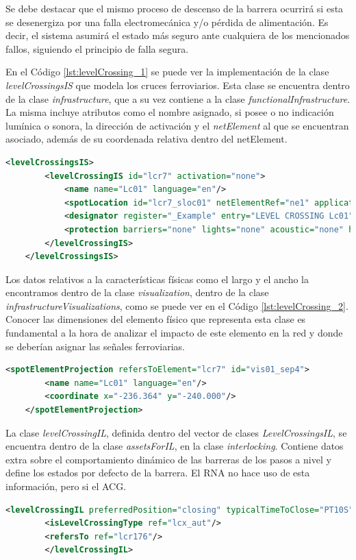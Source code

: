     Se debe destacar que el mismo proceso de descenso de la barrera ocurrirá si esta se desenergiza por una falla electromecánica y/o pérdida de alimentación. Es decir, el sistema asumirá el estado más seguro ante cualquiera de los mencionados fallos, siguiendo el principio de falla segura.

    En el Código \ref{lst:levelCrossing_1} se puede ver la implementación de la clase \textit{levelCrossingsIS} que modela los cruces ferroviarios. Esta clase se encuentra dentro de la clase \textit{infrastructure}, que a su vez contiene a la clase \textit{functionalInfrastructure}. La misma incluye atributos como el nombre asignado, si posee o no indicación lumínica o sonora, la dirección de activación y el \textit{netElement} al que se encuentran asociado, además de su coordenada relativa dentro del netElement.

    \begin{lstlisting}[language = XML, caption = Clase \textit{LevelCrossingsIS} , label = {lst:levelCrossing_1}]
    <levelCrossingsIS>
        <levelCrossingIS id="lcr7" activation="none">
            <name name="Lc01" language="en"/>
            <spotLocation id="lcr7_sloc01" netElementRef="ne1" applicationDirection="both" intrinsicCoord="0.3145"/>
            <designator register="_Example" entry="LEVEL CROSSING Lc01"/>
            <protection barriers="none" lights="none" acoustic="none" hasActiveProtection="true"/>
        </levelCrossingIS>
    </levelCrossingsIS>
    \end{lstlisting}

	Los datos relativos a la características físicas como el largo y el ancho la encontramos dentro de la clase \textit{visualization}, dentro de la clase \textit{infrastructureVisualizations}, como se puede ver en el Código \ref{lst:levelCrossing_2}.  Conocer las dimensiones del elemento físico que representa esta clase es fundamental a la hora de analizar el impacto de este elemento en la red y donde se deberían asignar las señales ferroviarias.
	
    \begin{lstlisting}[language = XML, caption = Clase \textit{Visualization} , label = {lst:levelCrossing_2}]
    <spotElementProjection refersToElement="lcr7" id="vis01_sep4">
        <name name="Lc01" language="en"/>
        <coordinate x="-236.364" y="-240.000"/>
    </spotElementProjection>
    \end{lstlisting}

    La clase \textit{levelCrossingIL}, definida dentro del vector de clases \textit{LevelCrossingsIL}, se encuentra dentro de la clase \textit{assetsForIL}, en la clase \textit{interlocking}. Contiene datos extra sobre el comportamiento dinámico de las barreras de los pasos a nivel y define los estados por defecto de la barrera. El RNA no hace uso de esta información, pero si el ACG.
    
    \begin{lstlisting}[language = XML, caption = Clase \textit{LevelCrossingIL} , label = {lst:levelCrossingIL}]
	    <levelCrossingIL preferredPosition="closing" typicalTimeToClose="PT10S" id="il_lcr176">
	    <isLevelCrossingType ref="lcx_aut"/>
	    <refersTo ref="lcr176"/>
	    </levelCrossingIL>
    \end{lstlisting}